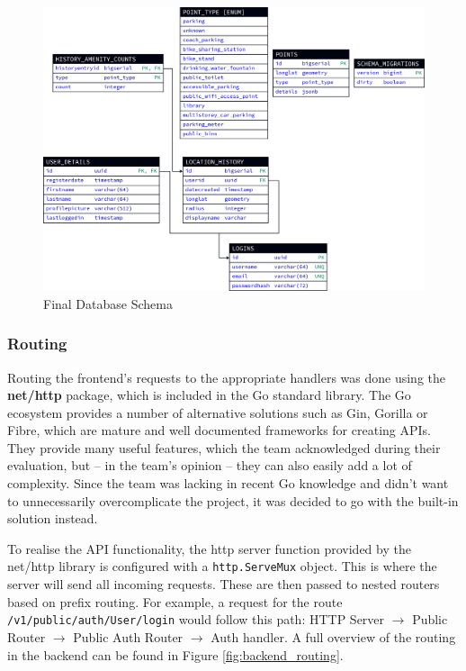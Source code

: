 \begin{figure}[htbp]
  \centering{}
  \includegraphics[width=\textwidth]{../d2-diagrams/database-final/database-final.png}
  \caption{Final Database Schema}
  \label{fig:database_final_schema}
\end{figure}

\subsubsection{Routing}
Routing the frontend's requests to the appropriate handlers was done using the
\textbf{net/http} package, which is included in the Go standard library. The Go
ecosystem provides a number of alternative solutions such as Gin, Gorilla or
Fibre, which are mature and well documented frameworks for creating APIs. They
provide many useful features, which the team acknowledged during their
evaluation, but -- in the team's opinion -- they can also easily add a lot of
complexity. Since the team was lacking in recent Go knowledge and didn't want to
unnecessarily overcomplicate the project, it was decided to go with the built-in
solution instead.

To realise the API functionality, the http server function provided by the
net/http library is configured with a \texttt{http.ServeMux} object. This is
where the server will send all incoming requests. These are then passed to
nested routers based on prefix routing. For example, a request for the route
\texttt{/v1/public/auth/User/login} would follow this path: HTTP Server
$\rightarrow$ Public Router $\rightarrow$ Public Auth Router $\rightarrow$ Auth
handler. A full overview of the routing in the backend can be found in Figure
\ref{fig:backend_routing}.

